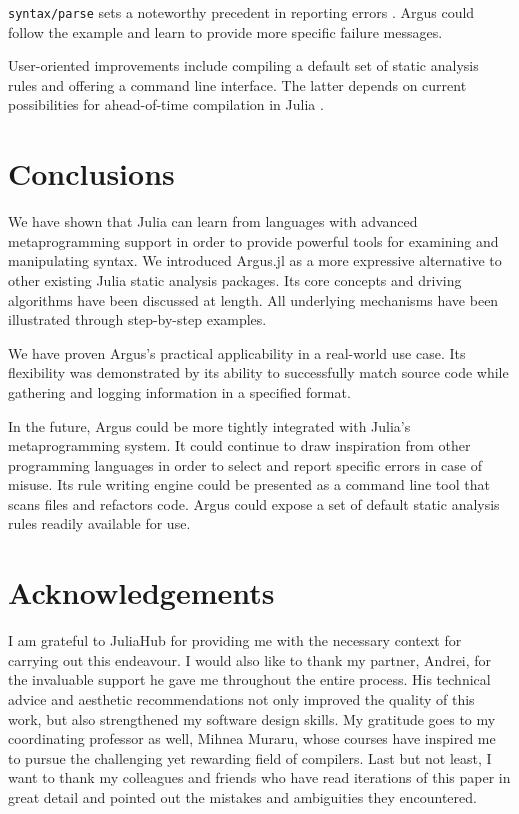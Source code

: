 \documentclass{juliacon}
\begin{document}
\texttt{syntax/parse} sets a noteworthy precedent in reporting errors
\cite{fortifying_macros}. Argus could follow the example and learn to
provide more specific failure messages.

User-oriented improvements include compiling a default set of static
analysis rules and offering a command line interface. The latter
depends on current possibilities for ahead-of-time compilation in
Julia \cite{julia_aot}.

\section{Conclusions}
\label{sec:org757539b}

We have shown that Julia can learn from languages with advanced
metaprogramming support in order to provide powerful tools for
examining and manipulating syntax. We introduced Argus.jl as a more
expressive alternative to other existing Julia static analysis
packages. Its core concepts and driving algorithms have been discussed
at length. All underlying mechanisms have been illustrated through
step-by-step examples.

We have proven Argus's practical applicability in a real-world use
case. Its flexibility was demonstrated by its ability to successfully
match source code while gathering and logging information in a
specified format.

In the future, Argus could be more tightly integrated with Julia's
metaprogramming system. It could continue to draw inspiration from
other programming languages in order to select and report specific
errors in case of misuse. Its rule writing engine could be presented
as a command line tool that scans files and refactors code. Argus
could expose a set of default static analysis rules readily available
for use.

\section{Acknowledgements}

I am grateful to JuliaHub for providing me with the necessary context
for carrying out this endeavour.
I would also like to thank my partner, Andrei, for the invaluable
support he gave me throughout the entire process. His technical
advice and aesthetic recommendations not only improved the quality
of this work, but also strengthened my software design skills.
My gratitude goes to my coordinating professor as well, Mihnea Muraru,
whose  courses have inspired me to pursue the challenging yet
rewarding field of compilers.
Last but not least, I want to thank my colleagues and friends who have
read iterations of this paper in great detail and pointed out the
mistakes and ambiguities they encountered.


\end{document}
